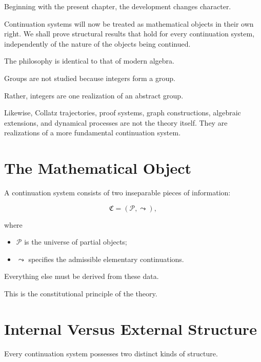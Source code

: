 \documentclass[13pt,openany]{book}
\theoremstyle{plain}
\theoremstyle{definition}
\begin{document}
Beginning with the present chapter, the development changes character.

Continuation systems will now be treated as mathematical objects in their
own right. We shall prove structural results that hold for every
continuation system, independently of the nature of the objects being
continued.

The philosophy is identical to that of modern algebra.

Groups are not studied because integers form a group.

Rather, integers are one realization of an abstract group.

Likewise, Collatz trajectories, proof systems, graph constructions,
algebraic extensions, and dynamical processes are not the theory itself.
They are realizations of a more fundamental continuation system.

\section{The Mathematical Object}

A continuation system consists of two inseparable pieces of information:

\[
\mathfrak C=(\mathcal P,\leadsto),
\]

where

\begin{itemize}
\item \(\mathcal P\) is the universe of partial objects;
\item \(\leadsto\) specifies the admissible elementary continuations.
\end{itemize}

Everything else must be derived from these data.

This is the constitutional principle of the theory.

\section{Internal Versus External Structure}

Every continuation system possesses two distinct kinds of structure.
\end{document}
